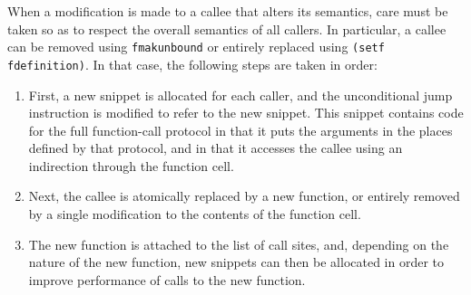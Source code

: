 When a modification is made to a callee that alters its semantics,
care must be taken so as to respect the overall semantics of all
callers.  In particular, a callee can be removed using
\texttt{fmakunbound} or entirely replaced using \texttt{(setf
  fdefinition)}.  In that case, the following steps are taken in
order:

\begin{enumerate}
\item First, a new snippet is allocated for each caller, and the
  unconditional jump instruction is modified to refer to the new
  snippet.  This snippet contains code for the full function-call
  protocol in that it puts the arguments in the places defined by that
  protocol, and in that it accesses the callee using an indirection
  through the function cell.
\item Next, the callee is atomically replaced by a new function, or
  entirely removed by a single modification to the contents of the
  function cell.
\item The new function is attached to the list of call sites, and,
  depending on the nature of the new function, new snippets can then
  be allocated in order to improve performance of calls to the new
  function.
\end{enumerate}
